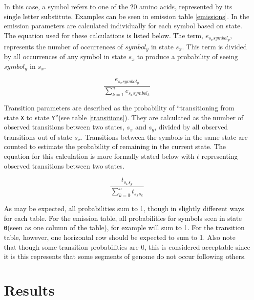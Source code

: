 \documentclass[a4paper,11pt]{article}
\begin{document}
In this case, a symbol refers to one of the 20 amino acids, represented by its single letter substitute. Examples can be seen in emission table \ref{emissions}. In the emission parameters are calculated individually for each symbol based on state. The equation used for these calculations is listed below. The term, $e_{s_{x}symbol_y}$, represents the number of occurrences of $symbol_y$ in state $s_x$. This term is divided by all occurrences of any symbol in state $s_x$ to produce a probability of seeing $symbol_y$ in $s_x$.

\begin{equation}
    \frac{e_{s_{x}symbol_y}}{\sum_{k=1}^n e_{s_xsymbol_k}}
\end{equation}


Transition parameters are described as the probability of ``transitioning from state \verb+X+ to state \verb+Y+''(see table \ref{transitions}). They are calculated as the number of observed transitions between two states, $s_x$ and $s_y$, divided by all observed transitions out of state $s_x$. Transitions between the symbols in the same state are counted to estimate the probability of remaining in the current state. The equation for this calculation is more formally stated below with $t$ representing observed transitions between two states.

\begin{equation}
    \frac{t_{s_{x}s_{y}}}{\sum_{k = 0}^{n} t_{s_{x}s_{k}}}
\end{equation}

As may be expected, all probabilities sum to 1, though in slightly different ways for each table. For the emission table, all probabilities for symbols seen in state \verb+0+(seen as one column of the table), for example will sum to 1. For the transition table, however, one horizontal row should be expected to sum to 1. Also note that though some transition probabilities are 0, this is considered acceptable since it is this represents that some segments of genome do not occur following others.

\section{Results}
\end{document}
